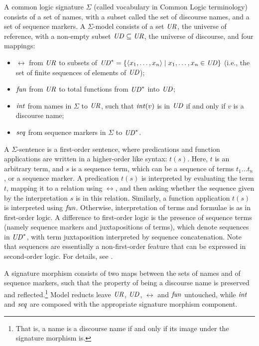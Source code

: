 \documentclass[10pt,fleqn,%
\ifpretendfinal
final%
\else
draft%
\fi,
]{scrreprt}
\begin{document}
\begin{definition}\label{CommonLogic}
A common logic signature
$\Sigma$ (called vocabulary in Common Logic terminology) consists of a
set of names, with a subset called the set of discourse names, and a
set of sequence markers. 
A $\Sigma$-model consists of a set $\mathit{UR}$,
the universe of reference, with a non-empty subset $\mathit{UD}\subseteq \mathit{UR}$,
the universe of discourse, and four mappings:
  \begin{itemize}
   \item $\rel$ from $\mathit{UR}$ to subsets of $\mathit{UD}^* = \{\langle x_1,\ldots,x_n \rangle \mid x_1,\ldots,x_n \in \mathit{UD}\}$ (i.e., the set of finite sequences of
elements of $\mathit{UD}$);
   \item $\mathit{fun}$ from $\mathit{UR}$ to total functions from $\mathit{UD}^*$ into $\mathit{UD}$;
   \item $\mathit{int}$ from names in $\Sigma$ to $\mathit{UR}$, such that
$\mathit{int}(v)$ is in $\mathit{UD}$ if and only if $v$ is a discourse name;
   \item $\mathit{seq}$ from sequence markers in $\Sigma$ to $\mathit{UD}^*$.
  \end{itemize}  A $\Sigma$-sentence is a first-order
sentence, where predications and function applications are written
in a higher-order like syntax: $t(s)$.
Here, $t$ is an arbitrary term, and $s$ is a sequence term, which can
be a sequence of terms $t_1\ldots t_n$, or a sequence marker.
A predication $t(s)$ is interpreted by evaluating the term $t$,
mapping it to a relation using $\rel$, and then asking whether the sequence
given by the interpretation $s$ is in this relation.  
Similarly, a function application $t(s)$ is interpreted using $\mathit{fun}$.
Otherwise, interpretation of terms and formulae is as in
first-order logic. 
A 
difference to first-order logic is the presence of sequence terms (namely sequence markers and
juxtapositions of terms), which denote sequences in $\mathit{UD}^*$, with term
juxtaposition interpreted by sequence concatenation.
Note that sequences are essentially a non-first-order feature that
can be expressed in second-order logic.
For details, see \cite{CommonLogic:oldfashioned}.

A \Clogic signature morphism 
consists of two maps between the sets of names and of sequence markers, such that the property of 
being a discourse name is preserved and reflected.\footnote{That is, a name is a discourse
name if and only if its image under the signature morphism is.}
  Model reducts leave $\mathit{UR}$, $\mathit{UD}$, 
$\rel$ and $\mathit{fun}$ untouched, while $\mathit{int}$ and $\mathit{seq}$ are composed with the appropriate
signature morphism component.
\end{definition}
%
\end{document}

